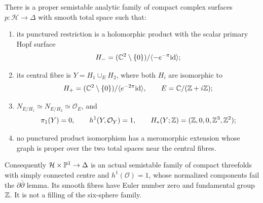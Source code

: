 \begin{proposition}
There is a proper semistable analytic family of compact complex
surfaces $p:\mathcal H\to\Delta$ with smooth total space such that:
\begin{enumerate}
\item its punctured restriction is a holomorphic product with the
scalar primary Hopf surface
\[
 H_-=(\mathbb C^2\setminus\{0\})/\langle -e^{-\pi}\mathrm{id}\rangle;
\]
\item its central fibre is $Y=H_1\cup_E H_2$, where both $H_i$
are isomorphic to
\[
 H_+=(\mathbb C^2\setminus\{0\})/\langle e^{-2\pi}\mathrm{id}\rangle,
 \qquad E=\mathbb C/(\mathbb Z+i\mathbb Z);
\]
\item $N_{E/H_1}\simeq N_{E/H_2}\simeq\mathcal O_E$, and
\[
 \pi_1(Y)=0,\qquad h^1(Y,\mathcal O_Y)=1,
 \qquad H_*(Y;\mathbb Z)=(\mathbb Z,0,0,\mathbb Z^3,\mathbb Z^2);
\]
\item no punctured product isomorphism has a meromorphic extension
whose graph is proper over the two total spaces near the central
fibres.
\end{enumerate}
Consequently $\mathcal H\times\mathbb P^1\to\Delta$ is an actual
semistable family of compact threefolds with simply connected centre
and $h^1(\mathcal O)=1$, whose normalized components fail the
$\partial\bar\partial$ lemma.  Its smooth fibres have Euler number
zero and fundamental group $\mathbb Z$.  It is not a filling of the
six-sphere family.
\end{proposition}
